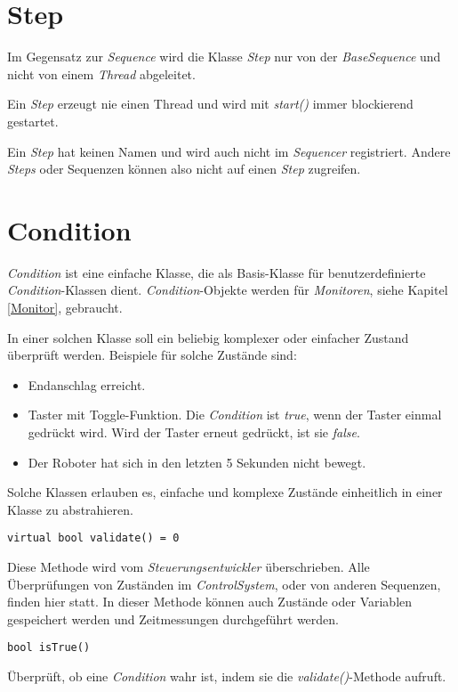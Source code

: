 \section{Step}
Im Gegensatz zur \textit{Sequence} wird die Klasse \textit{Step} nur von der \textit{BaseSequence} und nicht von einem \textit{Thread} abgeleitet.

Ein \textit{Step} erzeugt nie einen Thread und wird mit \textit{start()} immer blockierend gestartet.

Ein \textit{Step} hat keinen Namen und wird auch nicht im \textit{Sequencer} registriert.
Andere \textit{Steps} oder Sequenzen können also nicht auf einen \textit{Step} zugreifen.



\section{Condition}
\label{Condition}
\textit{Condition} ist eine einfache Klasse, die als Basis-Klasse für benutzerdefinierte \textit{Condition}-Klassen dient.
\textit{Condition}-Objekte werden für \textit{Monitoren}, siehe Kapitel \ref{Monitor}, gebraucht.

In einer solchen Klasse soll ein beliebig komplexer oder einfacher Zustand überprüft werden.
Beispiele für solche Zustände sind:
\begin{itemize}
\item Endanschlag erreicht.
\item Taster mit Toggle-Funktion. Die \textit{Condition} ist \textit{true}, wenn der Taster einmal gedrückt wird. Wird der Taster erneut gedrückt, ist sie \textit{false}.
\item Der Roboter hat sich in den letzten 5 Sekunden nicht bewegt.
\end{itemize}

Solche Klassen erlauben es, einfache und komplexe Zustände einheitlich in einer Klasse zu abstrahieren.

\begin{lstlisting}
virtual bool validate() = 0
\end{lstlisting}
Diese Methode wird vom \textit{Steuerungsentwickler} überschrieben.
Alle Überprüfungen von Zuständen im \textit{ControlSystem}, oder von anderen Sequenzen, finden hier statt.
In dieser Methode können auch Zustände oder Variablen gespeichert werden und Zeitmessungen durchgeführt werden.


\begin{lstlisting}
bool isTrue()
\end{lstlisting}
Überprüft, ob eine \textit{Condition} wahr ist, indem sie die \textit{validate()}-Methode aufruft.



